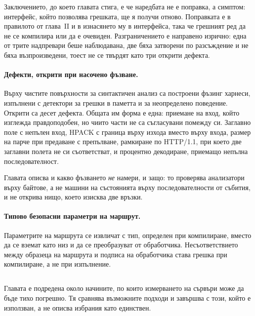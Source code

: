 Заключението, до което главата стига, е че наредбата не е поправка, а симптом: интерфейс,
който позволява грешката, ще я получи отново. Поправката е в правилото от глава~II и в
изнасянето му в интерфейса, така че грешният ред да не се компилира или да е очевиден.
Разграничението е направено изрично: една от трите надпревари беше наблюдавана, две бяха
затворени по разсъждение и не бяха възпроизведени, тоест не се твърдят като три открити
дефекта.

\paragraph{Дефекти, открити при насочено фъзване.} Върху чистите повърхности за синтактичен
анализ са построени фъзинг харнеси, изпълнени с детектори за грешки в паметта и за
неопределено поведение. Открити са десет дефекта. Общата им форма е една: приемане на вход,
който изглежда правдоподобен, но чиито части не са съгласувани помежду си. Заглавно поле
 с непълен вход, HPACK с граница върху изхода вместо върху входа, размер на парче
при предаване с препълване, рамкиране по HTTP/1.1, при което две заглавни полета не си
съответстват, и процентно декодиране, приемащо непълна последователност.

Главата описва и какво фъзването \emph{не} намери, и защо: то проверява анализатори върху
байтове, а не машини на състоянията върху последователности от събития, и не открива нищо,
което изисква две връзки.

\paragraph{Типово безопасни параметри на маршрут.} Параметрите на маршрута се извличат с тип,
определен при компилиране, вместо да се вземат като низ и да се преобразуват от обработчика.
Несъответствието между образеца на маршрута и подписа на обработчика става грешка при
компилиране, а не при изпълнение.

\subsection*{}

Главата е подредена около начините, по които измерването на сървъри може да бъде тихо
погрешно. Тя сравнява възможните подходи и завършва с този, който е използван, а не описва
избрания като единствен.

